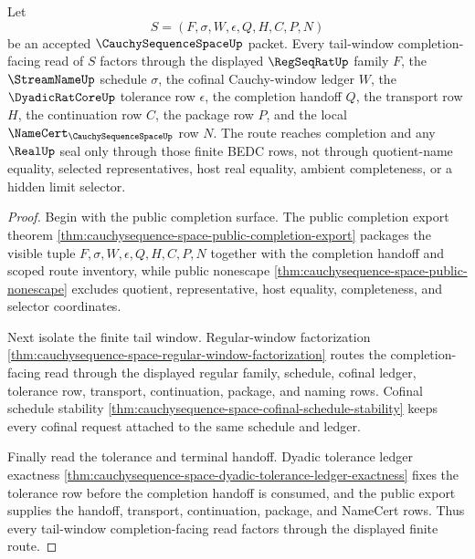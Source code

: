 \begin{theorem}
\label{thm:cauchysequence-space-tail-window-factorization}
Let
$$
S=(F,\sigma,W,\epsilon,Q,H,C,P,N)
$$
be an accepted $\CauchySequenceSpaceUp$ packet. Every tail-window completion-facing read of $S$ factors through the displayed $\RegSeqRatUp$ family $F$, the $\StreamNameUp$ schedule $\sigma$, the cofinal Cauchy-window ledger $W$, the $\DyadicRatCoreUp$ tolerance row $\epsilon$, the completion handoff $Q$, the transport row $H$, the continuation row $C$, the package row $P$, and the local $\NameCert_{\CauchySequenceSpaceUp}$ row $N$. The route reaches completion and any $\RealUp$ seal only through those finite BEDC rows, not through quotient-name equality, selected representatives, host real equality, ambient completeness, or a hidden limit selector.
\end{theorem}
\begin{proof}
Begin with the public completion surface. The public completion export theorem \autoref{thm:cauchysequence-space-public-completion-export} packages the visible tuple $F,\sigma,W,\epsilon,Q,H,C,P,N$ together with the completion handoff and scoped route inventory, while public nonescape \autoref{thm:cauchysequence-space-public-nonescape} excludes quotient, representative, host equality, completeness, and selector coordinates.

Next isolate the finite tail window. Regular-window factorization \autoref{thm:cauchysequence-space-regular-window-factorization} routes the completion-facing read through the displayed regular family, schedule, cofinal ledger, tolerance row, transport, continuation, package, and naming rows. Cofinal schedule stability \autoref{thm:cauchysequence-space-cofinal-schedule-stability} keeps every cofinal request attached to the same schedule and ledger.

Finally read the tolerance and terminal handoff. Dyadic tolerance ledger exactness \autoref{thm:cauchysequence-space-dyadic-tolerance-ledger-exactness} fixes the tolerance row before the completion handoff is consumed, and the public export supplies the handoff, transport, continuation, package, and NameCert rows. Thus every tail-window completion-facing read factors through the displayed finite route.
\end{proof}


